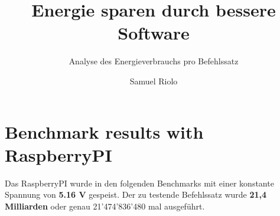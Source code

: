 \documentclass{../template/ffhsthesis}
\begin{document}


\title{Energie sparen durch bessere Software}
\subtitle{Analyse des Energieverbrauchs pro Befehlssatz} %
\author{Samuel Riolo}


\maketitle



\startThesis
\chapter{Benchmark results with RaspberryPI}
Das RaspberryPI wurde in den folgenden Benchmarks mit einer konstante Spannung von \textbf{5.16 V} gespeist. Der zu testende Befehlssatz wurde \textbf{21,4 Milliarden} oder genau 21'474'836'480 mal ausgeführt.

\tikzset{every picture/.style=thick}
\end{document}
